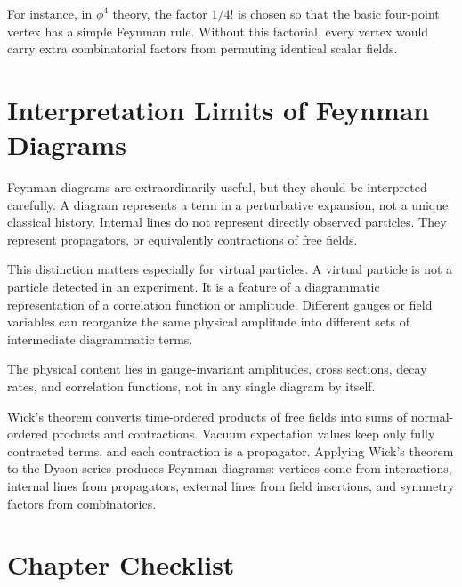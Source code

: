 For instance, in \(\phi^4\) theory, the factor \(1/4!\) is chosen so that the
basic four-point vertex has a simple Feynman rule. Without this factorial, every
vertex would carry extra combinatorial factors from permuting identical scalar
fields.

\section{Interpretation Limits of Feynman Diagrams}

Feynman diagrams are extraordinarily useful, but they should be interpreted
carefully. A diagram represents a term in a perturbative expansion, not a unique
classical history. Internal lines do not represent directly observed particles.
They represent propagators, or equivalently contractions of free fields.

This distinction matters especially for virtual particles. A virtual particle is
not a particle detected in an experiment. It is a feature of a diagrammatic
representation of a correlation function or amplitude. Different gauges or field
variables can reorganize the same physical amplitude into different sets of
intermediate diagrammatic terms.

The physical content lies in gauge-invariant amplitudes, cross sections, decay
rates, and correlation functions, not in any single diagram by itself.

\begin{summarybox}
Wick's theorem converts time-ordered products of free fields into sums of
normal-ordered products and contractions. Vacuum expectation values keep only
fully contracted terms, and each contraction is a propagator. Applying Wick's
theorem to the Dyson series produces Feynman diagrams: vertices come from
interactions, internal lines from propagators, external lines from field
insertions, and symmetry factors from combinatorics.
\end{summarybox}

\section{Chapter Checklist}

